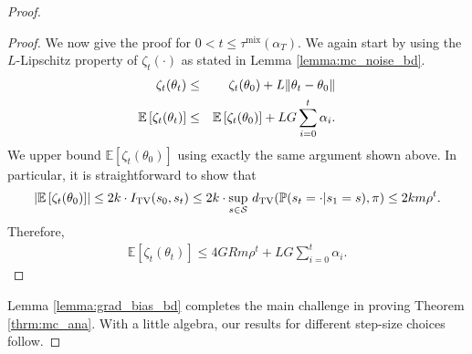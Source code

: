 \documentclass{colt2018} %
\DeclareMathOperator*{\mix}{mix}
\begin{document}
\begin{proof}
\begin{proof}
We now give the proof for $0 < t \leq \tau^{\mix}(\alpha_T) $. We again start by using the $L$-Lipschitz property of $\zeta_t(\cdot)$ as stated in Lemma \ref{lemma:mc_noise_bd}.
\begin{eqnarray*}
\zeta_t(\theta_t) &\leq& \zeta_t(\theta_0) + L \norm{\theta_t - \theta_0} \nonumber \\
\mathbb{E}\left[\zeta_t(\theta_t)\right] &\leq& \mathbb{E} \left[\zeta_t(\theta_0)\right] + LG \sum_{i=0}^t \alpha_i.
\end{eqnarray*}
We upper bound $\mathbb{E} \left[\zeta_t(\theta_0)\right]$ using exactly the same argument shown above. In particular, it is straightforward to show that  
\begin{eqnarray*}
\abs{\mathbb{E}\left[ \zeta_t(\theta_0) \right]} \leq 2k \cdot I_{\text{TV}}(s_0,s_t) \leq 2k \cdot \sup_{s \in \mathcal{S}} \, d_{\text{TV}}(\mathbb{P}(s_t = \cdot|s_1 = s), \pi) \leq 2 k m \rho^t.
\end{eqnarray*}
Therefore, 
\begin{eqnarray*}
\mathbb{E}\left[\zeta_t(\theta_t)\right] \leq 4GR m \rho^t + LG \sum_{i=0}^t \alpha_i.
\end{eqnarray*}
\end{proof}
Lemma \ref{lemma:grad_bias_bd} completes the main challenge in proving Theorem \ref{thrm:mc_ana}. With a little algebra,  our results for different step-size choices follow.

\end{proof}
\end{document}
